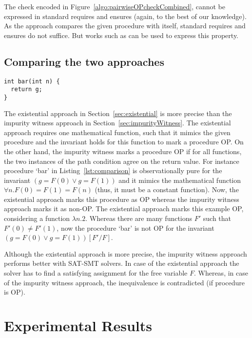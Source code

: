 \documentclass{llncs}
\newcommand{\F}{\mathit{F}}
\begin{document}
The check encoded in Figure~\ref{algo:pairwiseOPcheckCombined}, cannot
be expressed in standard requires and ensures (again, to the best of
our knowledge). As the approach compares the given procedure with
itself, standard requires and ensures do not suffice. But works such as
\cite{lahiri2013differential} can be used to express this property. 

\subsection{Comparing the two approaches}

\begin{lstlisting}[caption={Procedure `bar': illustrates that
      existential approach is more precise that the impurity witness
      approach.}, label=lst:comparison]
int bar(int n) { 
  return g; 
}
\end{lstlisting}

The existential approach in Section~\ref{sec:existential} is more
precise than the impurity witness approach in
Section~\ref{sec:impurityWitness}. The existential approach requires
one mathematical function, such that it mimics the given procedure and
the invariant holds for this function to mark a procedure OP. On the
other hand, the impurity witness marks a procedure OP if for all
functions, the two instances of the path condition agree on the return
value. For instance procedure `bar' in Listing~\ref{lst:comparison} is
observationally pure for the invariant $(g = \F(0) \vee g = \F(1))$
and it mimics the mathematical function $\forall n. \F(0) = \F(1) =
\F(n)$ (thus, it must be a constant function). Now, the existential
approach marks this procedure as OP whereas the impurity witness
approach marks it as non-OP. The existential approach marks this
example OP, considering a function $\lambda n. 2$. Whereas there are
many functions $\F'$ such that $\F'(0) \neq \F'(1)$, now the procedure
`bar' is not OP for the invariant $(g = \F(0) \vee g =
\F(1))[\F'/\F]$.

Although the existential approach is more precise, the impurity
witness approach performs better with SAT-SMT solvers. In case of the
existential approach the solver has to find a satisfying assignment
for the free variable $\F$. Whereas, in case of the impurity witness
approach, the inequivalence is contradicted (if procedure is OP).

\section{Experimental Results}\label{sec:experiments}
\end{document}
